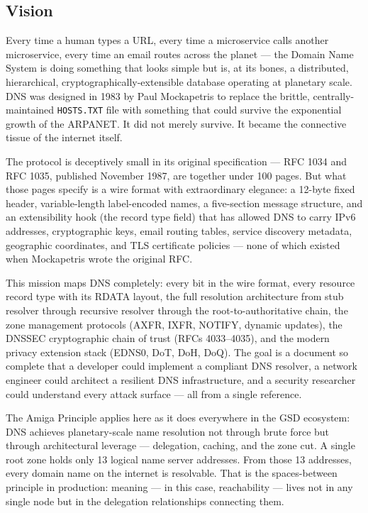 \documentclass[11pt,letterpaper]{article}
\begin{document}
\subsection{Vision}

Every time a human types a URL, every time a microservice calls another microservice, every time an email routes across the planet --- the Domain Name System is doing something that looks simple but is, at its bones, a distributed, hierarchical, cryptographically-extensible database operating at planetary scale. DNS was designed in 1983 by Paul Mockapetris to replace the brittle, centrally-maintained \texttt{HOSTS.TXT} file with something that could survive the exponential growth of the ARPANET. It did not merely survive. It became the connective tissue of the internet itself.

The protocol is deceptively small in its original specification --- RFC 1034 and RFC 1035, published November 1987, are together under 100 pages. But what those pages specify is a wire format with extraordinary elegance: a 12-byte fixed header, variable-length label-encoded names, a five-section message structure, and an extensibility hook (the record type field) that has allowed DNS to carry IPv6 addresses, cryptographic keys, email routing tables, service discovery metadata, geographic coordinates, and TLS certificate policies --- none of which existed when Mockapetris wrote the original RFC.

This mission maps DNS completely: every bit in the wire format, every resource record type with its RDATA layout, the full resolution architecture from stub resolver through recursive resolver through the root-to-authoritative chain, the zone management protocols (AXFR, IXFR, NOTIFY, dynamic updates), the DNSSEC cryptographic chain of trust (RFCs 4033--4035), and the modern privacy extension stack (EDNS0, DoT, DoH, DoQ). The goal is a document so complete that a developer could implement a compliant DNS resolver, a network engineer could architect a resilient DNS infrastructure, and a security researcher could understand every attack surface --- all from a single reference.

The Amiga Principle applies here as it does everywhere in the GSD ecosystem: DNS achieves planetary-scale name resolution not through brute force but through architectural leverage --- delegation, caching, and the zone cut. A single root zone holds only 13 logical name server addresses. From those 13 addresses, every domain name on the internet is resolvable. That is the spaces-between principle in production: meaning --- in this case, reachability --- lives not in any single node but in the delegation relationships connecting them.
\end{document}
